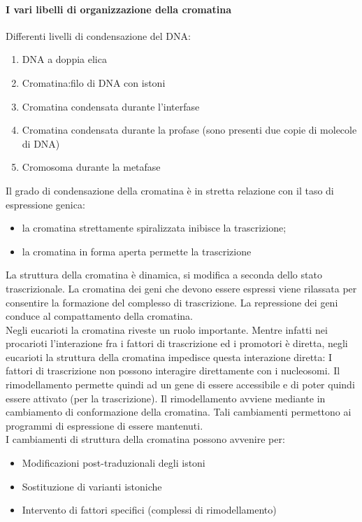 \documentclass{article}
\begin{document}
\paragraph{I vari libelli di organizzazione della cromatina}
Differenti livelli di condensazione del DNA:
\begin{enumerate}
    \item DNA a doppia elica
    \item Cromatina:filo di DNA con istoni
    \item Cromatina condensata durante l'interfase
    \item Cromatina condensata durante la profase (sono presenti due copie di molecole di DNA)
    \item Cromosoma durante la metafase
\end{enumerate}
Il grado di condensazione della cromatina è in stretta relazione con il taso di espressione genica:
\begin{itemize}
    \item la cromatina strettamente spiralizzata inibisce la trascrizione;
    \item la cromatina in forma aperta permette la trascrizione
\end{itemize}
La struttura della cromatina è dinamica, si modifica a seconda dello stato trascrizionale.
La cromatina dei geni che devono essere espressi viene rilassata per consentire la formazione del complesso di trascrizione. La repressione dei geni conduce al compattamento della cromatina.\\
Negli eucarioti la cromatina riveste un ruolo importante. Mentre infatti nei procarioti l'interazione fra i fattori di trascrizione ed i promotori
è diretta, negli eucarioti la struttura della cromatina impedisce questa
interazione diretta: I fattori di trascrizione non possono interagire direttamente con i nucleosomi.
Il rimodellamento permette quindi ad un gene di essere accessibile e di poter
quindi essere attivato (per la trascrizione). Il rimodellamento avviene mediante in cambiamento di conformazione della
cromatina. Tali cambiamenti permettono ai programmi di espressione di essere mantenuti.\\
I cambiamenti di struttura della cromatina possono avvenire per:
\begin{itemize}
    \item Modificazioni post-traduzionali degli istoni
    \item Sostituzione di varianti istoniche
    \item Intervento di fattori specifici (complessi di rimodellamento)
\end{itemize}
\end{document}
